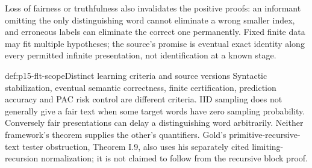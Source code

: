 Loss of fairness or truthfulness also invalidates the positive
proofs: an informant omitting the only distinguishing word
cannot eliminate a wrong smaller index, and erroneous labels
can eliminate the correct one permanently.
Fixed finite data may fit multiple hypotheses; the source's
promise is eventual exact identity along every permitted
infinite presentation, not identification at a known stage.

\begin{proofboundary}{def:p15-flt-scope}{Distinct learning criteria and source versions}
Syntactic stabilization, eventual semantic correctness,
finite certification, prediction accuracy and PAC risk
control are different criteria.
IID sampling does not generally give a fair text when some
target words have zero sampling probability. Conversely
fair presentations can delay a distinguishing word arbitrarily.
Neither framework's theorem supplies the other's quantifiers.
Gold's primitive-recursive-text tester obstruction, Theorem I.9,
also uses his separately cited limiting-recursion normalization;
it is not claimed to follow from the recursive block proof.
\end{proofboundary}
